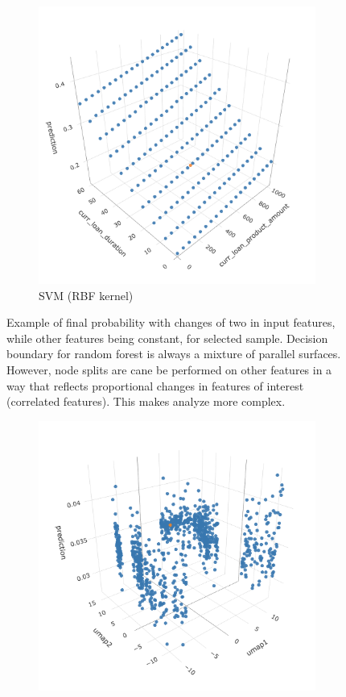 \documentclass{article}
\begin{document}
\begin{samepage}
\begin{figure}
\begin{subfigure}{.32\textwidth}
    \end{subfigure}
    \begin{subfigure}{.32\textwidth}
        \centering
        \includegraphics[width=.8\linewidth]{img/posthoc-admissible-svm.png}
        \caption{SVM (RBF kernel)}
        \label{fig:posthoc-admissible-lsvm}
    \end{subfigure}
    \caption{Example of final probability with changes of two in input features, while other features being constant, for selected sample. Decision boundary for random forest is always a mixture of parallel surfaces. However, node splits are cane be performed on other features in a way that reflects proportional changes in features of interest (correlated features). This makes analyze more complex.}
    \label{fig:posthoc-admissible}
\end{figure}
\begin{figure}
    \centering
    \begin{subfigure}{.32\textwidth}
        \centering
        \includegraphics[width=.8\linewidth]{img/posthoc-embedding-lin.png}

\end{subfigure}
\end{figure}
\end{samepage}
\end{document}
